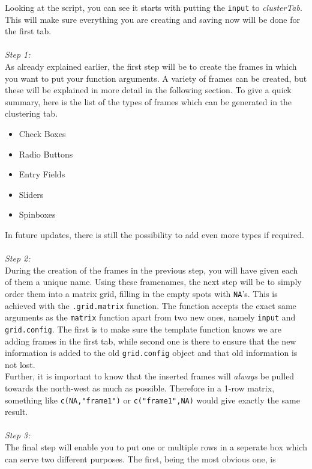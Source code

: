 \documentclass[a4paper]{article}\usepackage[]{graphicx}\usepackage[]{color}
\begin{document}
\noindent Looking at the script, you can see it starts with putting the
\verb|input| to {\it clusterTab}. This will make sure everything you are
creating and saving now will be done for the first tab. \\ \\
{\it Step 1:}\\
As already explained earlier, the first step will be to create the frames in
which you want to put your function arguments. A variety of frames can be
created, but these will be explained in more detail in the following section. To
give a quick summary, here is the list of the types of frames which can be
generated in the clustering tab.
\begin{itemize}
  \item Check Boxes
  \item Radio Buttons
  \item Entry Fields
  \item Sliders
  \item Spinboxes
\end{itemize}
\noindent In future updates, there is still the possibility to add even more
types if required.
\\ \\
{\it Step 2:}\\
During the creation of the frames in the previous step, you will have given each
of them a unique name. Using these framenames, the next step will be to simply
order them into a matrix grid, filling in the empty spots with \verb|NA|'s.
This is achieved with the \verb|.grid.matrix| function. The function accepts
the exact same arguments as the \verb|matrix| function apart from two new ones,
namely \verb|input| and \verb|grid.config|. The first is to make sure the
template function knows we are adding frames in the first tab, while second one
is there to ensure that the new information is added to the old
\verb|grid.config| object and that old information is not lost.\\
Further, it is important to know that the inserted frames will {\it always} be
pulled towards the north-west as much as possible. Therefore in a 1-row
matrix, something like \verb|c(NA,"frame1")| or \verb|c("frame1",NA)| would give
exactly the same result.
\\ \\
{\it Step 3:}\\
The final step will enable you to put one or multiple rows in a seperate box
which can serve two different purposes. The first, being the most obvious one, is
\end{document}
